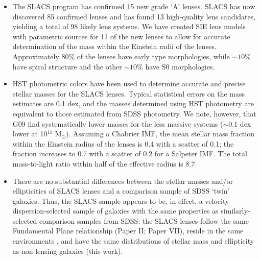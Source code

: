 \documentclass[iop]{emulateapj}
\begin{document}
\begin{itemize}
\item  The SLACS program has confirmed 15 new grade `A' lenses. SLACS has now discovered 85 confirmed lenses and has found 13 high-quality lens candidates, yielding a total of 98 likely lens systems. We have created SIE lens models with parametric sources for 11 of the new lenses to allow for accurate determination of the mass within the Einstein radii of the lenses. Approximately 80\% of the lenses have early type morphologies, while $\sim 10\%$ have spiral structure and the other $\sim 10\%$ have S0 morphologies. 

\item  HST photometric colors have been used to determine accurate and precise stellar masses for the SLACS lenses. Typical statistical errors on the mass estimates are 0.1 dex, and the masses determined using HST photometry are equivalent to those estimated from SDSS photometry. We note, however, that G09 find systematically lower masses for the less massive systems ($\sim 0.1$ dex lower at 10$^{11}$ M$_\odot$). Assuming a Chabrier IMF, the mean stellar mass fraction within the Einstein radius of the lenses is 0.4 with a scatter of 0.1; the fraction increases to 0.7 with a scatter of 0.2 for a Salpeter IMF. The total mass-to-light ratio within half of the effective radius is 8.7.

\item There are no substantial differences between the stellar masses and/or ellipticities of SLACS lenses and a comparison sample of SDSS `twin' galaxies. Thus, the SLACS sample appears to be, in effect, a velocity dispersion-selected sample of galaxies with the same properties as similarly-selected comparison samples from SDSS: the SLACS lenses follow the same Fundamental Plane relationship (Paper II; Paper VII), reside in the same environments \citep[Paper VIII;][]{auger}, and have the same distributions of stellar mass and ellipticity as non-lensing galaxies (this work).
\end{itemize}


\end{document}
